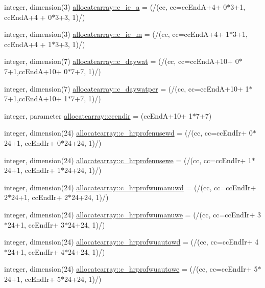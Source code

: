 \begin{DoxyCompactItemize}
\item 
integer, dimension(3) \hyperlink{namespaceallocatearray_a1c539078b4e93d885bf9e49a3908c552}{allocatearray\+::c\+\_\+ie\+\_\+a} = (/(cc, cc=cc\+EndA+4+ 0$\ast$3+1, cc\+EndA+4 + 0$\ast$3+3, 1)/)
\item 
integer, dimension(3) \hyperlink{namespaceallocatearray_a3f96e74f855b27cc4f66bac31735ba2b}{allocatearray\+::c\+\_\+ie\+\_\+m} = (/(cc, cc=cc\+EndA+4+ 1$\ast$3+1, cc\+EndA+4 + 1$\ast$3+3, 1)/)
\item 
integer, dimension(7) \hyperlink{namespaceallocatearray_a5740982b90c4175594f06cec32d0c8d7}{allocatearray\+::c\+\_\+daywat} = (/(cc, cc=cc\+EndA+10+ 0$\ast$7+1,cc\+EndA+10+ 0$\ast$7+7, 1)/)
\item 
integer, dimension(7) \hyperlink{namespaceallocatearray_a3222aa35653c2b388e922ec6f5dde9f1}{allocatearray\+::c\+\_\+daywatper} = (/(cc, cc=cc\+EndA+10+ 1$\ast$7+1,cc\+EndA+10+ 1$\ast$7+7, 1)/)
\item 
integer, parameter \hyperlink{namespaceallocatearray_a1e276529754e8a86220ffbb33ed42104}{allocatearray\+::ccendir} = (cc\+EndA+10+ 1$\ast$7+7)
\item 
integer, dimension(24) \hyperlink{namespaceallocatearray_af7360c52bc2192621d817bdbc4d60a9c}{allocatearray\+::c\+\_\+hrprofenusewd} = (/(cc, cc=cc\+End\+Ir+ 0$\ast$24+1, cc\+End\+Ir+ 0$\ast$24+24, 1)/)
\item 
integer, dimension(24) \hyperlink{namespaceallocatearray_a318c5a0cfc33bb9e3dcfa2eb8f18efec}{allocatearray\+::c\+\_\+hrprofenusewe} = (/(cc, cc=cc\+End\+Ir+ 1$\ast$24+1, cc\+End\+Ir+ 1$\ast$24+24, 1)/)
\item 
integer, dimension(24) \hyperlink{namespaceallocatearray_aa110accf8ca7f9ce8f65084bb3dfaf2d}{allocatearray\+::c\+\_\+hrprofwumanuwd} = (/(cc, cc=cc\+End\+Ir+ 2$\ast$24+1, cc\+End\+Ir+ 2$\ast$24+24, 1)/)
\item 
integer, dimension(24) \hyperlink{namespaceallocatearray_a8c6488d8e54bce9b139d4a7a755da8aa}{allocatearray\+::c\+\_\+hrprofwumanuwe} = (/(cc, cc=cc\+End\+Ir+ 3$\ast$24+1, cc\+End\+Ir+ 3$\ast$24+24, 1)/)
\item 
integer, dimension(24) \hyperlink{namespaceallocatearray_a374cc489abdda983951d0906c58b8577}{allocatearray\+::c\+\_\+hrprofwuautowd} = (/(cc, cc=cc\+End\+Ir+ 4$\ast$24+1, cc\+End\+Ir+ 4$\ast$24+24, 1)/)
\item 
integer, dimension(24) \hyperlink{namespaceallocatearray_ada575a8a824d37b4f6d017091a08376d}{allocatearray\+::c\+\_\+hrprofwuautowe} = (/(cc, cc=cc\+End\+Ir+ 5$\ast$24+1, cc\+End\+Ir+ 5$\ast$24+24, 1)/)

\end{DoxyCompactItemize}
